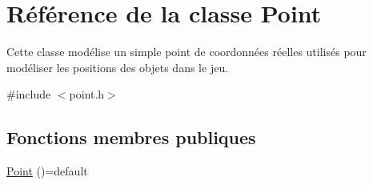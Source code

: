 \hypertarget{classPoint}{\section{Référence de la classe Point}
\label{classPoint}
}


Cette classe modélise un simple point de coordonnées réelles utilisés pour modéliser les positions des objets dans le jeu.  




{\ttfamily \#include $<$point.\+h$>$}

\subsection*{Fonctions membres publiques}
\begin{DoxyCompactItemize}
\item 
\hypertarget{classPoint_a257415ad611a16bb73628efcdb87d0fd}{\hyperlink{classPoint_a257415ad611a16bb73628efcdb87d0fd}{Point} ()=default}\label{classPoint_a257415ad611a16bb73628efcdb87d0fd}


\end{DoxyCompactItemize}
